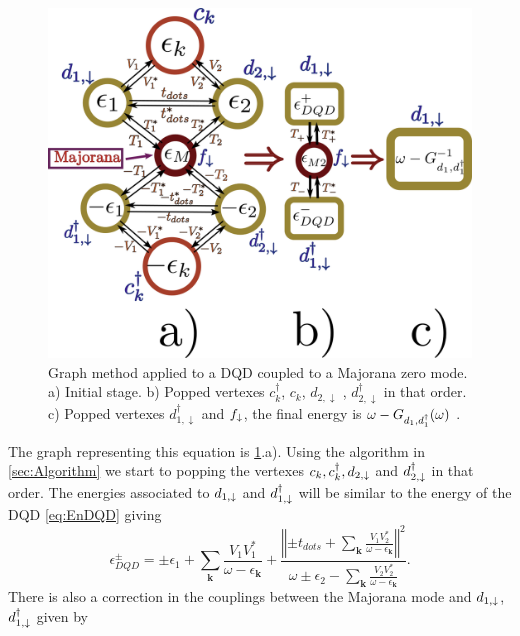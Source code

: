  
     \begin{figure}[bt]
    \centering
    \includegraphics[scale=0.4]{IMAGES/Graphs/FinalGraph.png}
    \caption{\label{fig:Graph-MDQD} Graph method applied to a DQD coupled to a Majorana zero mode. a) Initial stage. b) Popped vertexes $c^\dagger_k$, $c_k$, $d_{2, \downarrow}$ , $d^\dagger_{2, \downarrow}$ in that order. c) Popped vertexes $d^\dagger_{1, \downarrow}$ and $f_\downarrow$, the final energy is $\omega-G_{d_1,d_1^\dagger}(\omega)$  . \protect{}} 
    \end{figure}

 The graph representing this equation is \ref{fig:Graph-MDQD}.a). Using the algorithm in \ref{sec:Algorithm} we start to popping the vertexes $c_k,c^\dagger_k, d_{2,\downarrow}$ and $ d^\dagger_{2,\downarrow}$ in that order. The energies associated to $d_{1,\downarrow}$ and $d^\dagger_{1,\downarrow}$ will be similar to the energy of the DQD \eqref{eq:EnDQD} giving 
\begin{equation}
    \epsilon_{DQD}^{\pm}=\pm\epsilon_{1}+\sum_{\mathbf{k}}\frac{V_{1}V_{1}^{*}}{\omega-\epsilon_{\mathbf{k}}}+\frac{\left\Vert \pm t_{dots}+\sum_{\mathbf{k}}\frac{V_{1}V_{2}^{*}}{\omega-\epsilon_{\mathbf{k}}}\right\Vert ^{2}}{\omega\pm\epsilon_{2}-\sum_{\mathbf{k}}\frac{V_{2}V_{2}^{*}}{\omega-\epsilon_{\mathbf{k}}}}. \label{eq:epDQD}
\end{equation}
\noindent There is also a correction in the couplings between the Majorana mode and $d_{1,\downarrow}$, $d^\dagger_{1,\downarrow}$ given by 

